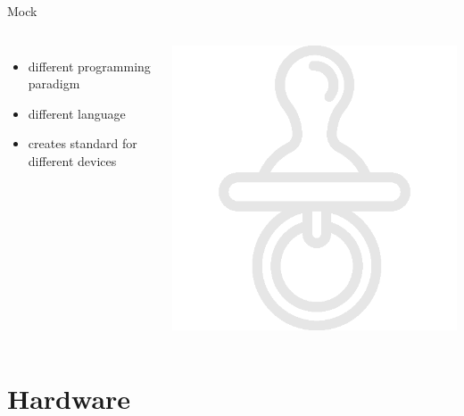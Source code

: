 \documentclass{beamer}
\begin{document}
	\begin{frame}{Mock}

		\begin{columns}[onlytextwidth,T]
		\column{\dimexpr\linewidth-30mm-5mm}
			\begin{itemize}
				\item different programming paradigm
				\item different language
				\item creates standard for different devices	
			\end{itemize}

	      \column{30mm}
	      \includegraphics[width=0.2\paperwidth]{Dummy.png}

	    \end{columns}

	\end{frame}



\section{Hardware}

\end{document}
